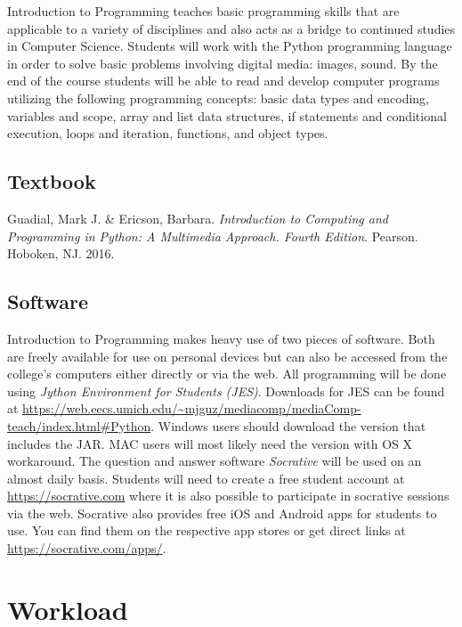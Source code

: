 \documentclass[10pt]{article}
\begin{document}
Introduction to Programming teaches basic programming skills that are applicable to a variety of disciplines and also acts as a bridge to continued studies in Computer Science. Students will work with the Python programming language in order to solve basic problems involving digital media: images, sound.  By the end of the course students will be able to read and develop computer programs utilizing the following programming concepts: basic data types and encoding, variables and scope, array and list data structures, if statements and conditional execution, loops and iteration, functions, and object types.

\subsection{Textbook}

\noindent
Guadial, Mark J. \& Ericson, Barbara. \textit{Introduction to Computing and Programming in Python: A Multimedia Approach. Fourth Edition}. Pearson. Hoboken, NJ. 2016. %


\subsection{Software}

Introduction to Programming makes heavy use of two pieces of software.  Both are freely available for use on personal devices but can also be accessed from the college's computers either directly or via the web. All programming will be done using \textit{Jython Environment for Students (JES)}. Downloads for JES can be found at \url{https://web.eecs.umich.edu/~mjguz/mediacomp/mediaComp-teach/index.html#Python}. Windows users should download the version that includes the JAR. MAC users will most likely need the version with OS X workaround. The question and answer software \textit{Socrative} will be used on an almost daily basis. Students will need to create a free student account at \url{https://socrative.com} where it is also possible to participate in socrative sessions via the web.  Socrative also provides free iOS and Android apps for students to use. You can find them on the respective app stores or get direct links at \url{https://socrative.com/apps/}.

\section{Workload}
\end{document}
